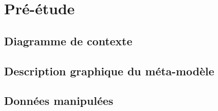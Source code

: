 \section{Pré-étude}


\subsection{ Diagramme de contexte }


\subsection{ Description graphique du méta-modèle }




\subsection{ Données manipulées }


